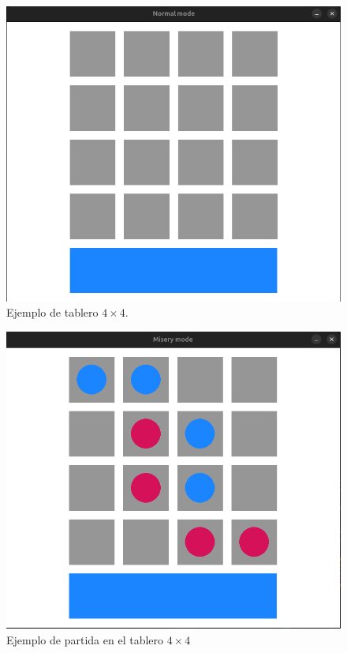 \documentclass[a4paper,12pt]{article}
\begin{document}
\vspace{\baselineskip}
\begin{figure}[ht]
    \centering
    \includegraphics[scale=0.3]{./imagenes/tablero4x4.png}
    \caption{Ejemplo de tablero $4 \times 4$.}\label{fig:tablero4x4}
\end{figure}

\vspace{\baselineskip}
\begin{figure}[htbp]
    \centering
    \includegraphics[scale=0.3]{./imagenes/partida4x4.png}
    \caption{Ejemplo de partida en el tablero $4 \times 4$}\label{fig:partida4x4}
\end{figure}
\end{document}
